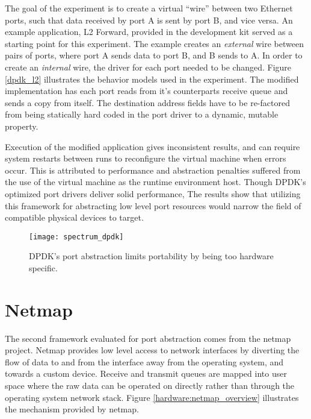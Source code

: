 The goal of the experiment is to create a virtual ``wire'' between two Ethernet
ports, such that data received by port A is sent by port B, and vice versa. An
example application, L2 Forward, provided in the development kit served as a
starting point for this experiment. The example creates an \emph{external}
wire between pairs of ports, where port A sends data to port B, and B sends to
A. In order to create an \emph{internal} wire, the driver for each port needed
to be changed. Figure \ref{dpdk_l2} illustrates the behavior models used in the
experiment. The modified implementation has each port reads from it's
counterparts receive queue and sends a copy from itself.  The destination
address fields have to be re-factored from being statically hard coded in the
port driver to a dynamic, mutable property.

Execution of the modified application gives inconsistent results, and can
require system restarts between runs to reconfigure the virtual machine when
errors occur. This is attributed to performance and abstraction penalties
suffered from the use of the virtual machine as the runtime environment host.
Though DPDK's optimized port drivers deliver solid performance,
The results show that utilizing this framework for abstracting low level port
resources would narrow the field of compatible physical devices to target.

\begin{figure}[h!]
  \centering
  \texttt{[image: spectrum\_dpdk]}
  \caption{DPDK's port abstraction limits portability by being too hardware
  specific.}
  \label{hardware:spectrum_dpdk}
\end{figure}

\section{Netmap}
\label{hardware:netmap}
The second framework evaluated for port abstraction comes from the netmap
project. Netmap provides low level access to network interfaces by diverting
the flow of data to and from the interface away from the operating system, and
towards a custom device. Receive and transmit queues are mapped into user space
where the raw data can be operated on directly rather than through the operating
system network stack. Figure \ref{hardware:netmap_overview} illustrates the
mechanism provided by netmap.

